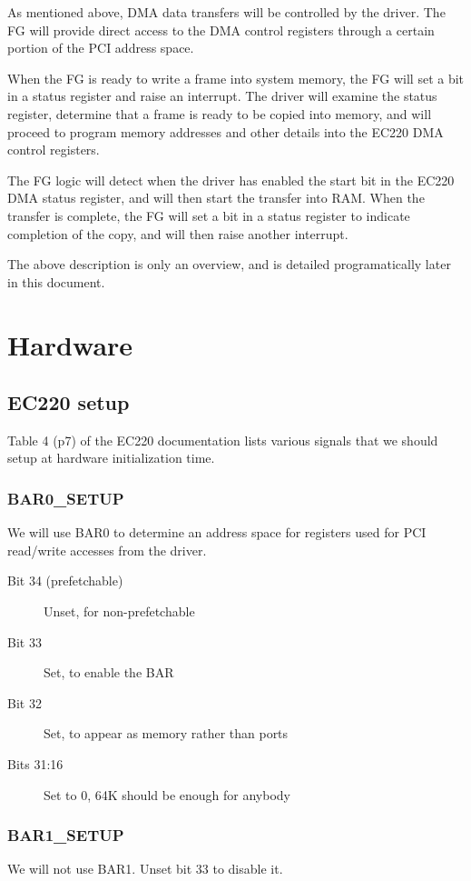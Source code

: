 \documentclass[12pt]{article}
\begin{document}
As mentioned above, DMA data transfers will be controlled by the driver. The FG will provide direct access to the DMA control registers through a certain portion of the PCI address space.

When the FG is ready to write a frame into system memory, the FG will set a bit in a status register and raise an interrupt. The driver will examine the status register, determine that a frame is ready to be copied into memory, and will proceed to program memory addresses and other details into the EC220 DMA control registers.

The FG logic will detect when the driver has enabled the start bit in the EC220 DMA status register, and will then start the transfer into RAM. When the transfer is complete, the FG will set a bit in a status register to indicate completion of the copy, and will then raise another interrupt.

The above description is only an overview, and is detailed programatically later in this document.

\section{Hardware}

\subsection{EC220 setup}

Table 4 (p7) of the EC220 documentation lists various signals that we should setup at hardware initialization time.

\subsubsection{BAR0\_SETUP}
We will use BAR0 to determine an address space for registers used for PCI read/write accesses from the driver.

\begin{description}
\item[Bit 34 (prefetchable)] Unset, for non-prefetchable
\item[Bit 33] Set, to enable the BAR
\item[Bit 32] Set, to appear as memory rather than ports
\item[Bits 31:16] Set to 0, 64K should be enough for anybody
\end{description}

\subsubsection{BAR1\_SETUP}
We will not use BAR1. Unset bit 33 to disable it.
\end{document}
